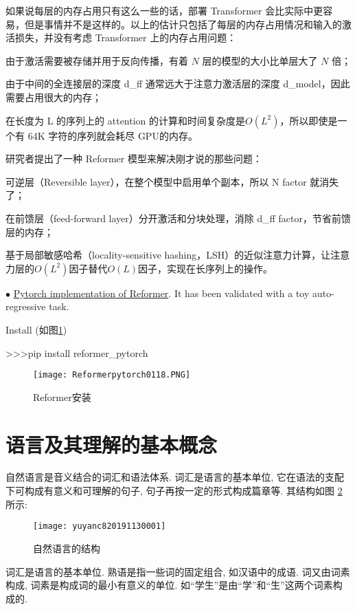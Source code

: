 如果说每层的内存占用只有这么一些的话，部署 Transformer 会比实际中更容易，但是事情并不是这样的。以上的估计只包括了每层的内存占用情况和输入的激活损失，并没有考虑 Transformer 上的内存占用问题：


由于激活需要被存储并用于反向传播，有着 $N$ 层的模型的大小比单层大了 $N$ 倍；

由于中间的全连接层的深度 d\_ff 通常远大于注意力激活层的深度 d\_model，因此需要占用很大的内存；

在长度为 L 的序列上的 attention 的计算和时间复杂度是$O(L^2)$，所以即使是一个有 64K 字符的序列就会耗尽 GPU的内存。

研究者提出了一种 Reformer 模型来解决刚才说的那些问题：

可逆层（Reversible layer），在整个模型中启用单个副本，所以 N factor 就消失了；

在前馈层（feed-forward layer）分开激活和分块处理，消除 d\_ff factor，节省前馈层的内存；

基于局部敏感哈希（locality-sensitive hashing，LSH）的近似注意力计算，让注意力层的$ O(L^2)$因子替代$ O(L)$因子，实现在长序列上的操作。

$\bullet$ \href{https://openreview.net/pdf?id=rkgNKkHtvB}{Pytorch implementation of Reformer}. It has been validated with a toy auto-regressive task.

Install (如图\ref{PycharmPytorchReformer})

>>>pip install reformer\_pytorch
\begin{figure}[htbp]
\centering
\texttt{[image: Reformerpytorch0118.PNG]}
\caption{Reformer安装}
\label{PycharmPytorchReformer}
\end{figure}
\section{语言及其理解的基本概念}
自然语言是音义结合的词汇和语法体系. 词汇是语言的基本单位, 它在语法的支配下可构成有意义和可理解的句子, 句子再按一定的形式构成篇章等. 其结构如图 \ref{AI32fig3001}所示:
\begin{figure}[H]
\centering
\texttt{[image: yuyanc820191130001]}
\caption{自然语言的结构}
\label{AI32fig3001}
\end{figure}

词汇是语言的基本单位. 熟语是指一些词的固定组合, 如汉语中的成语. 词又由词素构成, 词素是构成词的最小有意义的单位. 如“学生”是由“学”和“生”这两个词素构成的.


